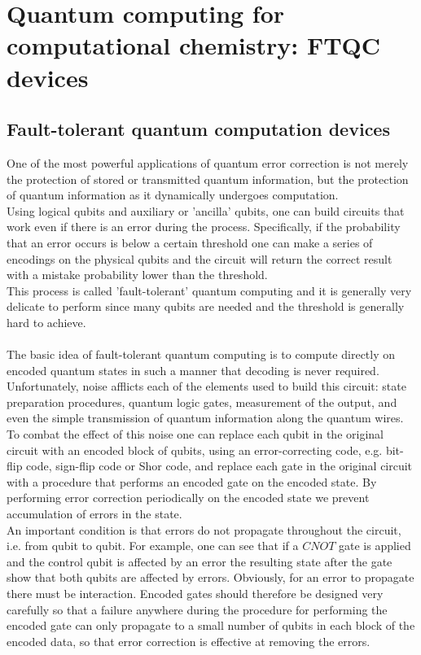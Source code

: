 \chapter{Quantum computing for computational chemistry: FTQC devices} \label{Quantum computing for computational chemistry: FTQC devices}

\section{Fault-tolerant quantum computation devices}
One of the most powerful applications of quantum error correction is not merely the protection of stored or transmitted quantum information, but the protection of quantum information as it dynamically undergoes computation. \\
Using logical qubits and auxiliary or 'ancilla' qubits, one can build circuits that work even if there is an error during the process. Specifically, if the probability that an error occurs is below a certain threshold one can make a series of encodings on the physical qubits and the circuit will return the correct result with a mistake probability lower than the threshold. \\
This process is called 'fault-tolerant' quantum computing and it is generally very delicate to perform since many qubits are needed and the threshold is generally hard to achieve. \\
\\
The basic idea of fault-tolerant quantum computing is to compute directly on encoded quantum states in such a manner that decoding is never required. \\
Unfortunately, noise afflicts each of the elements used to build this circuit: state preparation procedures, quantum logic gates, measurement of the output, and even the simple transmission of quantum information along the quantum wires. \\
To combat the effect of this noise one can replace each qubit in the original circuit with an encoded block of qubits, using an error-correcting code, e.g. bit-flip code, sign-flip code or Shor code, and replace each gate in the original circuit with a procedure that performs an encoded gate on the encoded state. By performing error correction periodically on the encoded state we prevent accumulation of errors in the state. \\
An important condition is that errors do not propagate throughout the circuit, i.e. from qubit to qubit. For example, one can see that if a $CNOT$ gate is applied and the control qubit is affected by an error the resulting state after the gate show that both qubits are affected by errors. Obviously, for an error to propagate there must be interaction. Encoded gates should therefore be designed very carefully so that a failure anywhere during the procedure for performing the encoded gate can only propagate to a small number of qubits in each block of the encoded data, so that error correction is effective at removing the errors. \\
